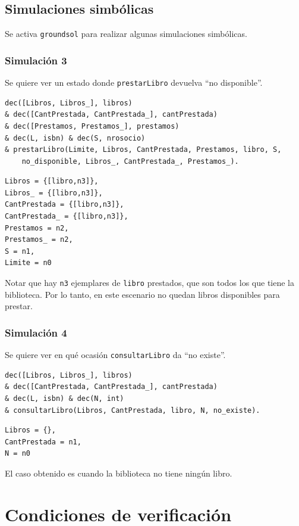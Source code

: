 \documentclass{article}
\begin{document}
\subsection{Simulaciones simbólicas}
Se activa \texttt{groundsol} para realizar algunas simulaciones simbólicas.

\subsubsection*{Simulación 3}
Se quiere ver un estado donde \texttt{prestarLibro} devuelva ``no disponible''.

\begin{verbatim}
dec([Libros, Libros_], libros) 
& dec([CantPrestada, CantPrestada_], cantPrestada) 
& dec([Prestamos, Prestamos_], prestamos) 
& dec(L, isbn) & dec(S, nrosocio) 
& prestarLibro(Limite, Libros, CantPrestada, Prestamos, libro, S, 
    no_disponible, Libros_, CantPrestada_, Prestamos_).
\end{verbatim}

\begin{verbatim}
Libros = {[libro,n3]},  
Libros_ = {[libro,n3]},  
CantPrestada = {[libro,n3]},  
CantPrestada_ = {[libro,n3]},  
Prestamos = n2,  
Prestamos_ = n2,  
S = n1,  
Limite = n0
\end{verbatim}

Notar que hay \texttt{n3} ejemplares de \texttt{libro} prestados, que son todos los que tiene la biblioteca. Por lo tanto, en este escenario no quedan libros disponibles para prestar.

\subsubsection*{Simulación 4}
Se quiere ver en qué ocasión \texttt{consultarLibro} da ``no existe''.
\begin{verbatim}
dec([Libros, Libros_], libros) 
& dec([CantPrestada, CantPrestada_], cantPrestada) 
& dec(L, isbn) & dec(N, int) 
& consultarLibro(Libros, CantPrestada, libro, N, no_existe).
\end{verbatim}

\begin{verbatim}
Libros = {},  
CantPrestada = n1,  
N = n0
\end{verbatim}

El caso obtenido es cuando la biblioteca no tiene ningún libro.

\section{Condiciones de verificación}
\end{document}
